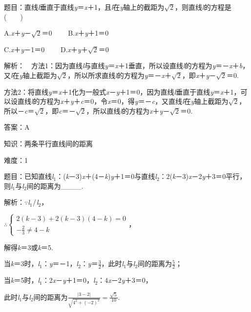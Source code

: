 \documentclass{article} %
\begin{document}
题目：直线\textit{l}垂直于直线\textit{y}＝\textit{x}＋1，且\textit{l}在\textit{y}轴上的截距为$\sqrt{2}$，则直线\textit{l}的方程是(　　)

A.\textit{x}＋\textit{y}－$\sqrt{2}$＝0　　  B.\textit{x}＋\textit{y}＋1＝0

C.\textit{x}＋\textit{y}－1＝0　　  D.\textit{x}＋\textit{y}＋$\sqrt{2}$＝0

解析：　方法1：因为直线\textit{l}与直线\textit{y}＝\textit{x}＋1垂直，所以设直线\textit{l}的方程为\textit{y}＝－\textit{x}＋\textit{b}，又\textit{l}在\textit{y}轴上截距为$\sqrt{2}$，所以所求直线\textit{l}的方程为\textit{y}＝－\textit{x}＋$\sqrt{2}$，即\textit{x}＋\textit{y}－$\sqrt{2}$＝0.

方法2：将直线\textit{y}＝\textit{x}＋1化为一般式\textit{x}－\textit{y}＋1＝0，因为直线\textit{l}垂直于直线\textit{y}＝\textit{x}＋1，可以设直线\textit{l}的方程为\textit{x}＋\textit{y}＋\textit{c}＝0，令\textit{x}＝0，得\textit{y}＝－\textit{c}，又直线\textit{l}在\textit{y}轴上截距为$\sqrt{2}$，所以－\textit{c}＝$\sqrt{2}$，即\textit{c}＝－$\sqrt{2}$，所以直线\textit{l}的方程为\textit{x}＋\textit{y}－$\sqrt{2}$＝0.

答案：A

知识：两条平行直线间的距离

难度：1

题目：已知直线\textit{l}${}_{1}$：(\textit{k}－3)\textit{x}＋(4－\textit{k})\textit{y}＋1＝0与直线\textit{l}${}_{2}$：2(\textit{k}－3)\textit{x}－2\textit{y}＋3＝0平行，则\textit{l}${}_{1}$与\textit{l}${}_{2}$间的距离为\_\_\_\_.

解析：$\mathrm{\because}$\textit{l}${}_{1}$$\mathrm{\//}$\textit{l}${}_{2}$，

$\mathrm{\therefore}\left\{\begin{array}{l} 2(k-3)+2(k-3)(4-k)=0\\ -\frac{2}{3}\neq 4-k \end{array}\right.$，

解得\textit{k}＝3或\textit{k}＝5.

当\textit{k}＝3时，\textit{l}${}_{1}$：\textit{y}＝－1，\textit{l}${}_{2}$：\textit{y}＝$\frac{3}{2}$，此时\textit{l}${}_{1}$与\textit{l}${}_{2}$间的距离为$\frac{5}{2}$；

当\textit{k}＝5时，\textit{l}${}_{1}$：2\textit{x}－\textit{y}＋1＝0，\textit{l}${}_{2}$：4\textit{x}－2\textit{y}＋3＝0，

此时\textit{l}${}_{1}$与\textit{l}${}_{2}$间的距离为$\frac{|3-2|}{\sqrt{4^2+(-2)^2}}=\frac{\sqrt{5}}{10}$.
\end{document}

